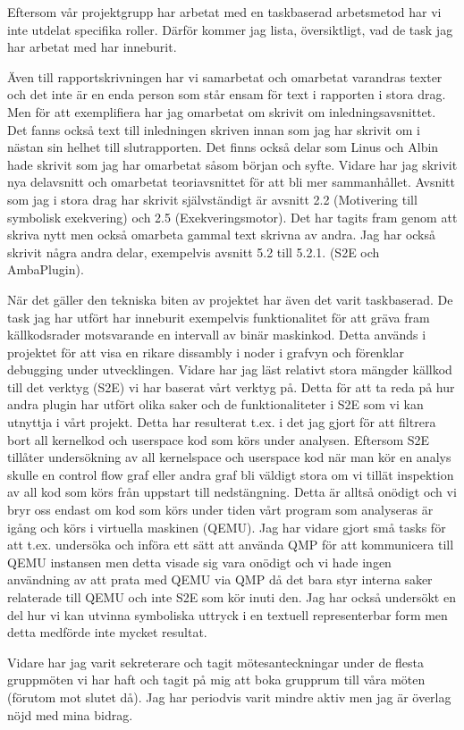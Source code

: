 Eftersom vår projektgrupp har arbetat med en taskbaserad arbetsmetod har vi
inte utdelat specifika roller. Därför kommer jag lista, översiktligt, vad de
task jag har arbetat med har inneburit.

Även till rapportskrivningen har vi samarbetat och omarbetat varandras texter
och det inte är en enda person som står ensam för text i rapporten i stora
drag. Men för att exemplifiera har jag omarbetat om skrivit om
inledningsavsnittet. Det fanns också text till inledningen skriven innan som
jag har skrivit om i nästan sin helhet till slutrapporten. Det finns också
delar som Linus och Albin hade skrivit som jag har omarbetat såsom början och
syfte. Vidare har jag skrivit nya delavsnitt och omarbetat teoriavsnittet för
att bli mer sammanhållet. Avsnitt som jag i stora drag har skrivit
självständigt är avsnitt 2.2 (Motivering till symbolisk exekvering) och 2.5
(Exekveringsmotor). Det har tagits fram genom att skriva nytt men också
omarbeta gammal text skrivna av andra. Jag har också skrivit några andra delar,
exempelvis avsnitt 5.2 till 5.2.1. (S2E och AmbaPlugin).

När det gäller den tekniska biten av projektet har även det varit taskbaserad.
De task jag har utfört har inneburit exempelvis funktionalitet för att gräva
fram källkodsrader motsvarande en intervall av binär maskinkod. Detta används i
projektet för att visa en rikare dissambly i noder i grafvyn och förenklar
debugging under utvecklingen. Vidare har jag läst relativt stora mängder
källkod till det verktyg (S2E) vi har baserat vårt verktyg på. Detta för att ta
reda på hur andra plugin har utfört olika saker och de funktionaliteter i S2E
som vi kan utnyttja i vårt projekt. Detta har resulterat t.ex. i det jag gjort
för att filtrera bort all kernelkod och userspace kod som körs under analysen.
Eftersom S2E tillåter undersökning av all kernelspace och userspace kod när man
kör en analys skulle en control flow graf eller andra graf bli väldigt stora om
vi tillät inspektion av all kod som körs från uppstart till nedstängning. Detta
är alltså onödigt och vi bryr oss endast om kod som körs under tiden vårt
program som analyseras är igång och körs i virtuella maskinen (QEMU). Jag har
vidare gjort små tasks för att t.ex. undersöka och införa ett sätt att använda
QMP för att kommunicera till QEMU instansen men detta visade sig vara onödigt
och vi hade ingen användning av att prata med QEMU via QMP då det bara styr
interna saker relaterade till QEMU och inte S2E som kör inuti den. Jag har
också undersökt en del hur vi kan utvinna symboliska uttryck i en textuell
representerbar form men detta medförde inte mycket resultat.

Vidare har jag varit sekreterare och tagit mötesanteckningar under de flesta
gruppmöten vi har haft och tagit på mig att boka grupprum till våra möten
(förutom mot slutet då). Jag har periodvis varit mindre aktiv men jag är
överlag nöjd med mina bidrag.

